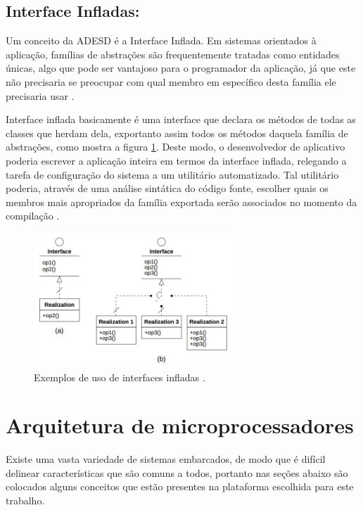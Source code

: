 \subsection{Interface Infladas: } Um conceito da ADESD é a Interface Inflada. %
Em sistemas orientados à aplicação, famílias de abstrações são frequentemente tratadas como entidades únicas, algo que pode ser vantajoso para o programador da aplicação, já que este não precisaria se preocupar com qual membro em específico desta família ele precisaria usar \cite{guto_thesis}.

Interface inflada basicamente é uma interface que declara os métodos de todas as classes que herdam dela, exportanto assim todos os métodos daquela família de abstrações, como mostra a figura \ref{fig:inflated}. Deste modo, o desenvolvedor de aplicativo poderia escrever a aplicação inteira em termos da interface inflada, relegando a tarefa de configuração do sistema a um utilitário automatizado. Tal utilitário poderia, através de uma análise sintática do código fonte, escolher quais os membros mais apropriados da família exportada serão associados no momento da compilação \cite[p.~56]{guto_thesis}.

\begin{figure}[ht!]
	\label{fig:inflated}
    \centering
    \includegraphics[width=7.5cm]{figuras/inflated_interface}
    \caption{Exemplos de uso de interfaces infladas \cite{guto_thesis}.}
\end{figure}




\section{Arquitetura de microprocessadores}

Existe uma vasta variedade de sistemas embarcados, de modo que é difícil delinear características que são comuns a todos, portanto nas seções abaixo são colocados alguns conceitos que estão presentes na plataforma escolhida para este trabalho.

